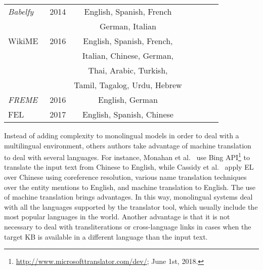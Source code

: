 \documentclass{llncs}
\newcommand{\cmark}{\ding{51}}%
\newcommand{\xmark}{}%
\begin{document}
\begin{table}[th!]
\begin{tabular}{lcccccr}
		\textit{Babelfy} \cite{Babelfy-moro2014entity}& 2014 &English, Spanish, French &\xmark&\cmark\\
		& &German, Italian&&&\\\midrule
		
		WikiME \cite{Cross-Lingual-Wikifier-tsai2016cross} & 2016 & English, Spanish, French,&\xmark&\xmark\\
		& &Italian, Chinese, German,&&&\\
		& &Thai, Arabic, Turkish,&&&\\
		& &Tamil, Tagalog, Urdu, Hebrew&&&\\\midrule		
        
        \textit{FREME}~\cite{freme-ner2016}&2016&English, German&\xmark&\cmark\\\midrule
		
		FEL~\cite{FEL-pappu2017lightweight}& 2017 &English, Spanish, Chinese&\xmark&\xmark\\

		\bottomrule
	\end{tabular}
\end{table}

Instead of adding complexity to monolingual models in order to deal with a multilingual environment, others authors take advantage of machine translation to deal with several languages. For instance, Monahan et al.~\cite{Monahan2011} use Bing API\footnote{\url{http://www.microsofttranslator.com/dev/}; June 1st, 2018.} to translate the input text from Chinese to English, while Cassidy et al.~\cite{Cassidy2012} apply EL over Chinese using coreference resolution, various name translation techniques over the entity mentions to English, and machine translation to English. The use of machine translation brings advantages. In this way, monolingual systems deal with all the languages supported by the translator tool, which usually include the most popular languages in the world. Another advantage is that it is not necessary to deal with transliterations or cross-language links in cases when the target KB is available in a different language than the input text. 
\end{document}
